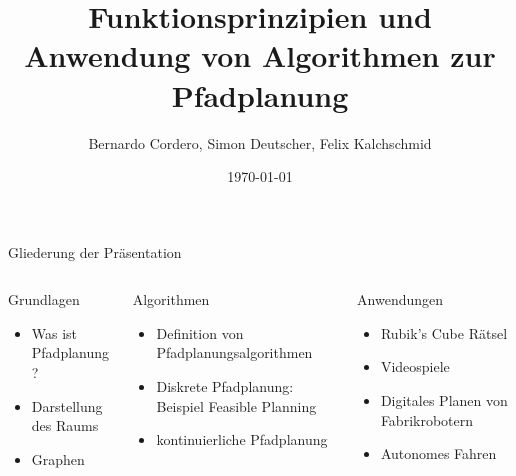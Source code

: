 \documentclass[t,aspectratio=169,dvipsnames]{beamer}
\title{Funktionsprinzipien und Anwendung von Algorithmen zur Pfadplanung}
\author{Bernardo Cordero, Simon Deutscher, Felix Kalchschmid}							%
\institute{Hochschule Trier}
\date{\today}
\begin{document}
\begin{frame}
	\titlepage
\end{frame}
\begin{frame}{Gliederung der Präsentation}
	\begin{columns}[T]
		\begin{column}[T]{0.33\textwidth}
			\begin{block}{Grundlagen}
				\begin{itemize}
					\item Was ist Pfadplanung?
					\item Darstellung des Raums
					\item Graphen
					\newline\newline\newline
				\end{itemize}
			\end{block}
		\end{column}
		\begin{column}[T]{0.33\textwidth}
			\begin{block}{Algorithmen}
				\begin{itemize}\color{lightgray}
					\item Definition von Pfadplanungsalgorithmen
					\item Diskrete Pfadplanung: Beispiel Feasible Planning
					\item kontinuierliche Pfadplanung
				\end{itemize}
			\end{block}
		\end{column}
		\begin{column}[T]{0.33\textwidth}
			\begin{block}{Anwendungen}
				\begin{itemize}\color{lightgray}
					\item Rubik's Cube Rätsel
					\item Videospiele
					\item Digitales Planen von Fabrikrobotern
					\item Autonomes Fahren
					\newline\newline
				\end{itemize}		
			\end{block}
		\end{column}
	\end{columns}	
\end{frame}
\end{document}
